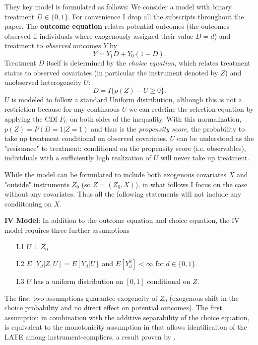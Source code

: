 \documentclass[11pt, a4paper, leqno]{article}
\begin{document}
They key model is formulated as follows: We consider a model with binary treatment $D\in\{0,1\}$. For convenience I drop all the subscripts throughout the paper.
The \textbf{outcome equation} relates potential outcomes (the outcomes observed if individuals where exogenously assigned their value $D=d$) and treatment to \textit{observed} outcomes $Y$ by
\begin{equation}
    Y = Y_1D + Y_0(1-D).
\end{equation}
Treatment $D$ itself is determined by the \textit{choice equation}, which relates treatment status to observed covariates (in particular the instrument denoted by $Z$) and unobserved heterogeneity $U$:
\begin{equation}
    D = I\{p(Z) - U \geq 0\}.
\end{equation}
$U$ is modeled to follow a standard Uniform distribution, although this is not a restriction because for any continuous $U$ we can redefine the selection equation by applying the CDf $F_U$ on both sides of the inequality.
With this normalization, $p(Z) = P(D=1|Z=1)$ and thus is the \textit{propensity score}, the probability to take up treatment conditional on observed covariates.
$U$ can be understood as the "resistance" to treatment: conditional on the propensity score (i.e. observables), individuals with a sufficiently high realization of $U$ will never take up treatment.

While the model can be formulated to include both exogenous covariates $X$ and "outside" instruments $Z_0$ (so $Z=(Z_0,X)$), in what follows I focus on the case without any covariates.
Thus all the following statements will not include any condiitoning on $X$.

\textbf{IV Model}: In addition to the outcome equation and choice equation, the IV model requires three further assumptions
\begin{itemize}
    \item[I.1] $U\perp Z_0$
    \item[I.2] $E[Y_d|Z,U] = E[Y_d|U]$ and $E[Y_d^2]<\infty$ for $d\in\{0,1\}$.
    \item[I.3] $U$ has a uniform distribution on $[0,1]$ conditional on $Z$.
\end{itemize}
The first two assumptions guarantee exogeneity of $Z_0$ (exogenous shift in the choice probability and no direct effect on potential outcomes).
The first assumption in combination with the additive separability of the choice equation, is equivalent to the monotonicity assumption in \citet{angrist1996identification} that allows identificaiton of the LATE among instrument-compliers, a result proven by \citet{vytlacil2002independence}.
\end{document}
